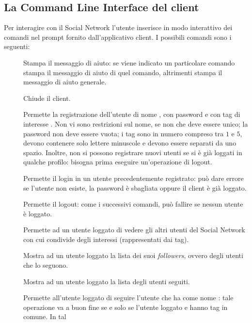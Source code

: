\documentclass[
    oneside,
    10pt,
    language=italian,
    a4paper,
    article
]{notes}
\begin{document}
\subsection{La Command Line Interface del client}
Per interagire con il Social Network l'utente inserisce in modo interattivo
dei comandi nel prompt fornito dall'applicativo client. I possibili comandi sono
i seguenti:
\begin{description}
    \item[] Stampa il messaggio di aiuto: se viene indicato
        un particolare comando stampa il messaggio di aiuto di quel comando,
        altrimenti stampa il messaggio di aiuto generale.
    \item[] Chiude il client.
    \item[] Permette la registrazione
        dell'utente di nome , con password  e
        con tag di interesse . Non vi sono restrizioni sul nome, se
        non che deve essere unico; la password non deve essere vuota; i tag
        sono in numero compreso tra $1$ e $5$, devono contenere solo lettere
        minuscole e devono essere separati da uno spazio. Inoltre, non si possono
        registrare nuovi utenti se si è già loggati in qualche profilo: bisogna
        prima eseguire un'operazione di logout.
    \item[] Permette il login in un utente
        precedentemente registrato: può dare errore se l'utente non esiste,
        la password è sbagliata oppure il client è già loggato.
    \item[] Permette il logout: come i successivi comandi, può fallire
        se nessun utente è loggato.
    \item[] Permette ad un utente loggato di vedere gli altri
        utenti del Social Network con cui condivide degli interessi (rappresentati
        dai tag).
    \item[] Mostra ad un utente loggato la lista dei suoi 
        \emph{followers}, ovvero degli utenti che lo seguono.
    \item[] Mostra ad un utente loggato la lista degli utenti
        seguiti.
    \item[] Permette all'utente loggato di seguire l'utente
        che ha come nome : tale operazione va a buon fine se e
        solo se l'utente loggato e  hanno tag in comune. In tal

\end{description}
\end{document}

